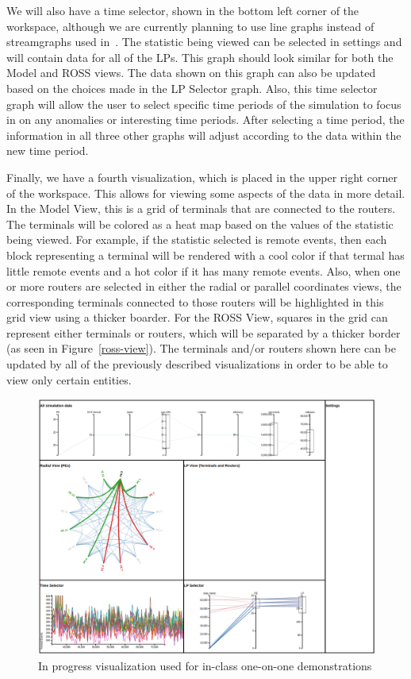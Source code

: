 \documentclass{acm_proc_article-sp}
\begin{document}
We will also have a time selector, shown in the bottom left corner of the workspace, although we are currently planning to use line graphs instead of streamgraphs used in~\cite{cheng}.  The statistic being viewed can be selected in settings and will contain data for all of the LPs.  This graph should look similar for both the Model and ROSS views.  The data shown on this graph can also be updated based on the choices made in the LP Selector graph. Also, this time selector graph will allow the user to select specific time periods of the simulation to focus in on any anomalies or interesting time periods. After selecting a time period, the information in all three other graphs will adjust according to the data within the new time period. 

Finally, we have a fourth visualization, which is placed in the upper right corner of the workspace.  This allows for viewing some aspects of the data in more detail.  In the Model View, this is a grid of terminals that are connected to the routers.  The terminals will be colored as a heat map based on the values of the statistic being viewed. For example, if the statistic selected is remote events, then each block representing a terminal will be rendered with a cool color if that termal has little remote events and a hot color if it has many remote events. Also, when one or more routers are selected in either the radial or parallel coordinates views, the corresponding terminals connected to those routers will be highlighted in this grid view using a thicker boarder. For the ROSS View, squares in the grid can represent either terminals or routers, which will be separated by a thicker border (as seen in Figure~\ref{ross-view}).  The terminals and/or routers shown here can be updated by all of the previously described visualizations in order to be able to view only certain entities.  
\begin{figure}[t]
\centering
   \includegraphics[width=6.5in]{demo1.png}
\caption{In progress visualization used for in-class one-on-one demonstrations}
\label{intm-vis}
\end{figure}
\end{document}
